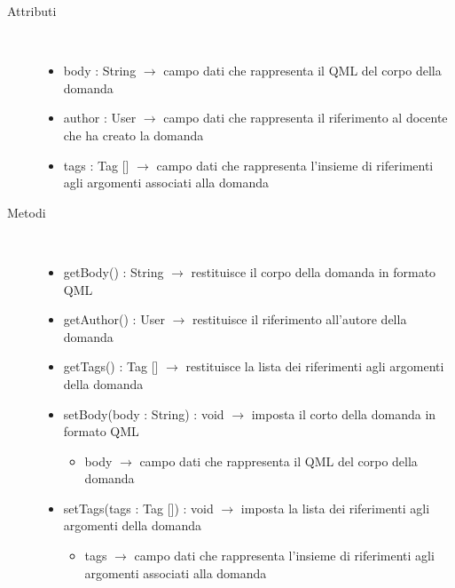 \begin{description}
\item[Attributi] \hfill \\
\vspace{-7mm}
\begin{itemize}
	\item body : String $\rightarrow$ campo dati che rappresenta il QML del corpo della domanda
	\item author : User $\rightarrow$ campo dati che rappresenta il riferimento al docente che ha creato la domanda
	\item tags : Tag [] $\rightarrow$ campo dati che rappresenta l'insieme di riferimenti agli argomenti associati alla domanda
\end{itemize}

\item[Metodi] \hfill \\
\vspace{-7mm}
\begin{itemize}
	\item getBody() : String $\rightarrow$ restituisce il corpo della domanda in formato QML
	\item getAuthor() : User $\rightarrow$ restituisce il riferimento all'autore della domanda
	\item getTags() : Tag [] $\rightarrow$ restituisce la lista dei riferimenti agli argomenti della domanda
	\item setBody(body : String) : void $\rightarrow$ imposta il corto della domanda in formato QML\begin{itemize}
		\item body $\rightarrow$ campo dati che rappresenta il QML del corpo della domanda
	\end{itemize}
	
	\item setTags(tags : Tag []) : void $\rightarrow$ imposta la lista dei riferimenti agli argomenti della domanda\begin{itemize}
		\item tags $\rightarrow$ campo dati che rappresenta l'insieme di riferimenti agli argomenti associati alla domanda
	\end{itemize}
	
\end{itemize}

\end{description}

\vspace{0.5cm}
\hypertarget{server::data::Role}{}
